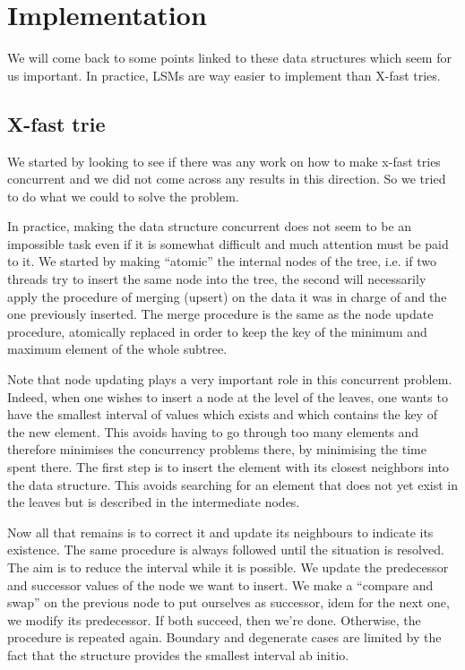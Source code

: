 
\section{Implementation}

We will come back to some points linked to these data structures which seem for us important. In practice, LSMs are way easier to implement than X-fast tries.

\subsection{X-fast trie}

We started by looking to see if there was any work on how to make x-fast tries concurrent and we did not come across any results in this direction. So we tried to do what we could to solve the problem.

In practice, making the data structure concurrent does not seem to be an impossible task even if it is somewhat difficult and much attention must be paid to it. We started by making ``atomic'' the internal nodes of the tree, i.e. if two threads try to insert the same node into the tree, the second will necessarily apply the procedure of merging (upsert) on the data it was in charge of and the one previously inserted. The merge procedure is the same as the node update procedure, atomically replaced in order to keep the key of the minimum and maximum element of the whole subtree.

Note that node updating plays a very important role in this concurrent problem. Indeed, when one wishes to insert a node at the level of the leaves, one wants to have the smallest interval of values which exists and which contains the key of the new element. This avoids having to go through too many elements and therefore minimises the concurrency problems there, by minimising the time spent there. The first step is to insert the element with its closest neighbors into the data structure. This avoids searching for an element that does not yet exist in the leaves but is described in the intermediate nodes.

Now all that remains is to correct it and update its neighbours to indicate its existence. The same procedure is always followed until the situation is resolved. The aim is to reduce the interval while it is possible. We update the predecessor and successor values of the node we want to insert. We make a ``compare and swap'' on the previous node to put ourselves as successor, idem for the next one, we modify its predecessor. If both succeed, then we're done. Otherwise, the procedure is repeated again. Boundary and degenerate cases are limited by the fact that the structure provides the smallest interval ab initio.

